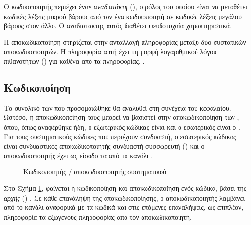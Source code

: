 Ο κωδικοποιητής  περιέχει έναν \textit{αναδιατάκτη} (), ο ρόλος του οποίου είναι να μεταθέτει κωδικές λέξεις μικρού βάρους από τον ένα κωδικοποιητή σε κωδικές λέξεις μεγάλου βάρους στον άλλο. Ο αναδιατάκτης αυτός διαθέτει ψευδοτυχαία χαρακτηριστικά.

Η αποκωδικοποίηση στηρίζεται στην ανταλλαγή  πληροφορίας μεταξύ δύο συστατικών αποκωδικοποιητών. Η πληροφορία αυτή έχει τη μορφή λογαριθμικού λόγου πιθανοτήτων () για καθένα από τα  πληροφορίας. \cite{berrou1993near}.

\subsection{Κωδικοποίηση }

Το συνολικό  των  που προσομοιώθηκε θα αναλυθεί στη συνέχεια του κεφαλαίου. Ωστόσο, η αποκωδικοποίηση τους μπορεί να βασιστεί στην  αποκωδικοποίηση των , όπου, όπως αναφέρθηκε ήδη, ο εξωτερικός κώδικας είναι  και ο εσωτερικός είναι ο . Για τους συστηματικούς  κώδικες που περιέχουν συνδυαστή, ο εσωτερικός κώδικας είναι συνδυαστικός αποκωδικοποιητής συνδυαστή-συσσωρευτή () και ο  αποκωδικοποιητής έχει ως είσοδο τα  από το κανάλι \cite{johnson2009iterative}.

\begin{figure}[h]
\caption{Κωδικοποιητής /  αποκωδικοποιητής συστηματικού }
\label{fig:enc/turbo dec of systematic RA}
\end{figure}

Στο Σχήμα \ref{fig:enc/turbo dec of systematic RA}, φαίνεται η κωδικοποίηση και αποκωδικοποίηση  ενός  κώδικα, βάσει της \textit{αρχής } () \cite{hagenauer2003turbo}. Σε κάθε επανάληψη της αποκωδικοποίησης, ο  αποκωδικοποιητής λαμβάνει  από το κανάλι αναφορικά με τα κωδικά  και στις επόμενες επαναλήψεις, ως επιπλέον,  πληροφορία τα  εξωγενούς πληροφορίας από τον  αποκωδικοποιητή.

